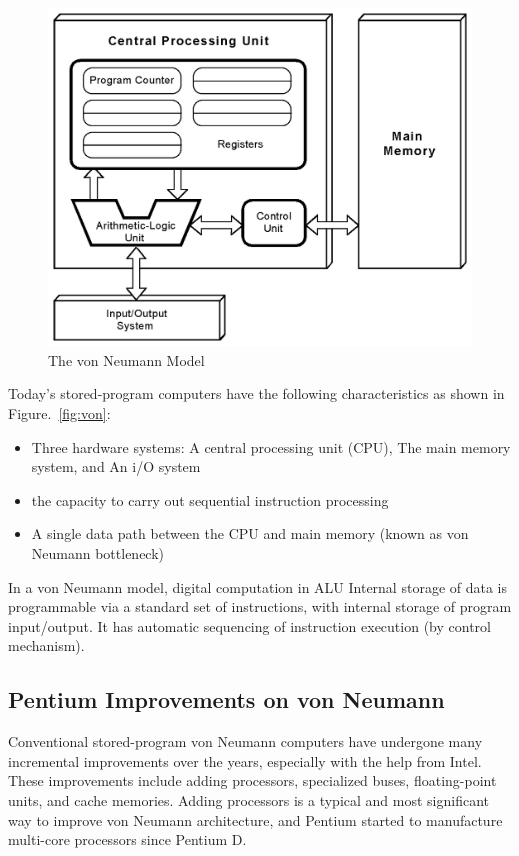 \documentclass[doc,natbib,12pt]{apa6}
\begin{document}
	\begin{figure}[htpb]
		\centering
		\includegraphics[width=1\textwidth]{von.png}
		\caption{\label{fig:von}The von Neumann Model \citep{Null2012}}
	\end{figure}
	
	Today's stored-program computers have the following characteristics as shown in Figure.~\vref{fig:von}:
	\begin{itemize}
		\item Three hardware systems: A central processing unit (CPU), The main memory system, and An i/O system
		\item the capacity to carry out sequential instruction processing
		\item A single data path between the CPU and main memory (known as von Neumann bottleneck)
	\end{itemize}
	
	In a von Neumann model, digital computation in ALU Internal storage of data is programmable via a standard set of instructions, with internal storage of program input/output. It has automatic sequencing of instruction execution (by control mechanism).
	
	\subsection{Pentium Improvements on von Neumann}
	Conventional stored-program von Neumann computers have undergone many incremental improvements over the years, especially with the help from Intel. These improvements include adding processors, specialized buses, floating-point units, and cache memories. Adding processors is a typical and most significant way to improve von Neumann architecture, and Pentium started to manufacture multi-core processors since Pentium D.
	
\end{document}
